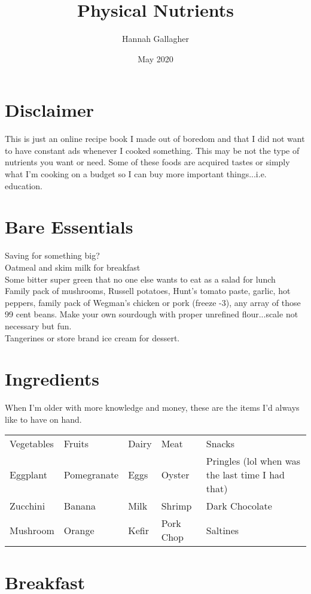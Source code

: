 \documentclass{article}
\title{Physical Nutrients}
\author{Hannah Gallagher}
\date{May 2020}
\begin{document}
\maketitle
\section*{Disclaimer}
This is just an online recipe book I made out of boredom and that I did not want to have constant ads whenever I cooked something. This may be not the type of nutrients you want or need. Some of these foods are acquired tastes or simply what I'm cooking on a budget so I can buy more important things...i.e. education.  
\section*{Bare Essentials}
Saving for something big? \\ 

Oatmeal and skim milk for breakfast \\ 
Some bitter super green that no one else wants to eat as a salad for lunch \\ 
Family pack of mushrooms, Russell potatoes, Hunt's tomato paste, garlic, hot peppers, family pack of Wegman's chicken or pork (freeze -3), any array of those 99 cent beans. Make your own sourdough with proper unrefined flour...scale not necessary but fun.\\ 
Tangerines or store brand ice cream for dessert. 

\section*{Ingredients}
When I'm older with more knowledge and money, these are the items I'd always like to have on hand.

\begin{table}
\begin{tabular}{lllll}
Vegetables & Fruits & Dairy & Meat & Snacks \\
Eggplant   & Pomegranate & Eggs & Oyster & Pringles (lol when was the last time I had that)\\
Zucchini   & Banana  & Milk & Shrimp & Dark Chocolate \\
Mushroom   & Orange & Kefir & Pork Chop & Saltines 
\end{tabular}
\end{table}

\section*{Breakfast}
\end{document}
